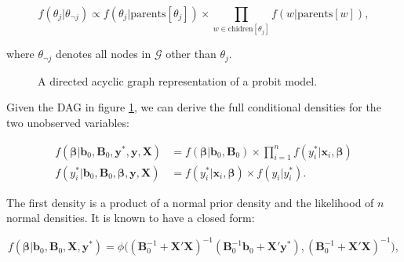 \documentclass[11pt,a4paper]{article}
\newcommand{\f}{\mathit{f}}
\begin{document}
\begin{equation}
\f(\theta_j | \theta_{\neg j}) \propto \f(\theta_j | \mathrm{parents}[\theta_j]) \times \prod_{w \in \mathrm{chidren}[\theta_j]} \f(w|\mathrm{parents}[w]),
\end{equation}

where $\theta_{\neg j}$ denotes all nodes in $\mathcal{G}$ other than $\theta_j$. 


\begin{figure}[!ht]
\centering


\caption{A directed acyclic graph representation of a probit model.} \label{fig:ProbitDAG}
\end{figure}

\newpage 

Given the DAG in figure \ref{fig:ProbitDAG}, we can derive the full conditional densities for the two unobserved variables: 

\begin{equation}
\begin{split}
\f(\boldsymbol{\beta} | \mathbf{b}_0, \mathbf{B}_0, \mathbf{y}^{*}, \mathbf{y}, \mathbf{X} ) &= 
	\f(\boldsymbol{\beta} | \mathbf{b}_0, \mathbf{B}_0) \times \prod_{i=1}^{n} \f(y_i^{*}|\mathbf{x}_i, \boldsymbol{\beta})\\
\f( y_i^{*} | \mathbf{b}_0, \mathbf{B}_0, \boldsymbol{\beta}, \mathbf{y}, \mathbf{X} ) &= 
	\f(y^{*}_i | \mathbf{x}_i, \boldsymbol{\beta}) \times \f(y_i | y^{*}_i). 
\end{split}
\end{equation}
	
The first density is a product of a normal prior density and the likelihood of $n$ normal densities. It is known to have a closed form:

\begin{equation}
	\f(\boldsymbol{\beta} | \mathbf{b}_0, \mathbf{B}_0, \mathbf{X}, \mathbf{y}^{*}) = 
		\phi \bigg (  (\mathbf{B}_0^{-1} + \mathbf{X}'\mathbf{X})^{-1} (\mathbf{B}_0^{-1} \mathbf{b}_0 + \mathbf{X}'\mathbf{y}^{*}), (\mathbf{B}_0^{-1} + \mathbf{X}'\mathbf{X})^{-1} \bigg ),
\end{equation} 
\end{document}
